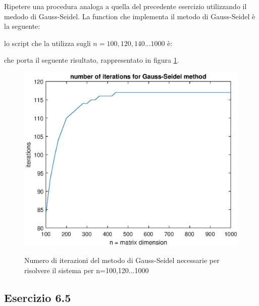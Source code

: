 Ripetere una procedura analoga a quella del precedente esercizio utilizzando il medodo di Gauss-Seidel.
\PP
La function che implementa il metodo di Gauss-Seidel è la seguente:

lo script che la utilizza sugli $n = 100, 120, 140 ... 1000$ è:

che porta il seguente risultato, rappresentato in figura \ref{fig:6_4_gauss}.\\
\begin{figure}[h!]
    \centering
    \includegraphics[scale=0.6]{./capitolo_6/exercise_6_4}
    \label{fig:6_4_gauss}
    \caption{Numero di iterazioni del metodo di Gauss-Seidel necessarie per risolvere il sistema per n=100,120...1000}
\end{figure}



	\subsection{Esercizio 6.5}
	
